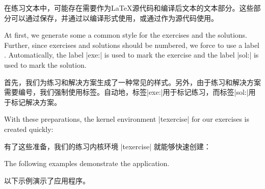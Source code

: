 在练习文本中，可能存在需要作为\LaTeX 源代码和编译后文本的文本部分。这些部分可以通过保存，并通过以编译形式使用，或通过作为源代码使用。

At first, we generate some a common style for the exercises and the
solutions. Further, since exercises and solutions should
be numbered, we force to use a label .
Automatically, the label |exe:| is used to mark the exercise
and the label |sol:| is used to mark the solution.

首先，我们为练习和解决方案生成了一种常见的样式。另外，由于练习和解决方案需要编号，我们强制使用标签。自动地，标签|exe:|用于标记练习，而标签|sol:|用于标记解决方案。

\begin{dispListing}
\end{dispListing}
\tcbusetemp

With these preparations, the kernel environment |texercise| for our
exercises is created quickly:

有了这些准备，我们的练习内核环境 |texercise| 就能够快速创建：


The following examples demonstrate the application.

以下示例演示了应用程序。

\begin{dispListing}
\tcbstartrecording
\end{dispListing}
\tcbusetemp


